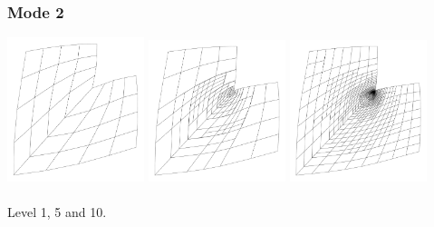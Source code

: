 \documentclass{beamer}
\begin{document}
\begin{frame}
  \frametitle{Mode 2}

  \begin{center}
    \includegraphics[width=0.3\textwidth]{lshape/mode-00-01}
    \includegraphics[width=0.3\textwidth]{lshape/mode-04-01}
    \includegraphics[width=0.3\textwidth]{lshape/mode-09-01}
   \\~\\
   Level 1, 5 and 10.
  \end{center}
\end{frame}


\end{document}
